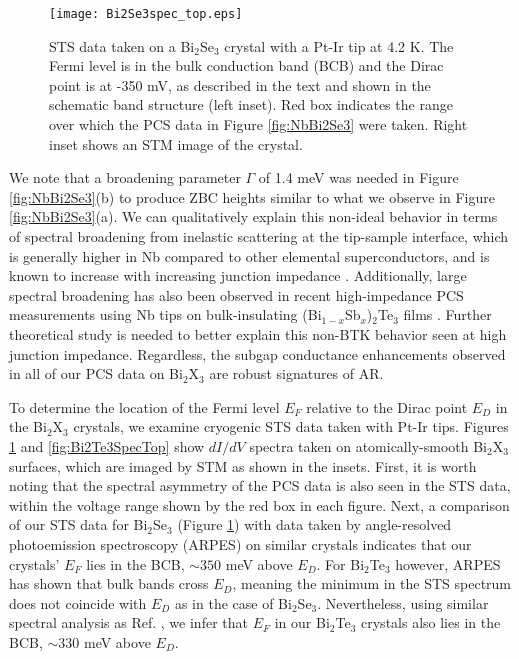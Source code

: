 \documentclass[aps,prl,twocolumn,showpacs,amsmath,amssymb,superscriptaddress,citeautoscript]{revtex4-1}
\begin{document}
\begin{figure}
\texttt{[image: Bi2Se3spec\_top.eps]}
\caption{\label{fig:Bi2Se3SpecTop} STS data taken on a Bi$_{2}$Se$_{3}$ crystal with a Pt-Ir tip at 4.2 K. The Fermi level is in the bulk conduction band (BCB) and the Dirac point is at -350 mV, as described in the text and shown in the schematic band structure (left inset).  Red box indicates the range over which the PCS data in Figure \ref{fig:NbBi2Se3} were taken.  Right inset shows an STM image of the crystal.}
\end{figure}


We note that a broadening parameter $\Gamma$ of 1.4 meV was needed in Figure \ref{fig:NbBi2Se3}(b) to produce ZBC heights similar to what we observe in Figure \ref{fig:NbBi2Se3}(a).  We can qualitatively explain this non-ideal behavior in terms of spectral broadening from inelastic scattering at the tip-sample interface, which is generally higher in Nb compared to other elemental superconductors, and is known to increase with increasing junction impedance \cite{Naidyuk1996,Slobodzian2002}. Additionally, large spectral broadening has also been observed in recent high-impedance PCS measurements using Nb tips on bulk-insulating (Bi$_{1-x}$Sb$_x$)$_2$Te$_3$ films \cite{Borisov2016}. Further theoretical study is needed to better explain this non-BTK behavior seen at high junction impedance.  Regardless, the subgap conductance enhancements observed in all of our PCS data on Bi$_{2}$X$_{3}$ are robust signatures of AR.


To determine the location of the Fermi level $E_{F}$ relative to the Dirac point $E_{D}$ in the Bi$_{2}$X$_{3}$ crystals, we examine cryogenic STS data taken with Pt-Ir tips.  Figures \ref{fig:Bi2Se3SpecTop} and \ref{fig:Bi2Te3SpecTop} show $dI/dV$ spectra taken on atomically-smooth Bi$_{2}$X$_{3}$ surfaces, which are imaged by STM as shown in the insets.  First, it is worth noting that the spectral asymmetry of the PCS data is also seen in the STS data, within the voltage range shown by the red box in each figure.  Next, a comparison of our STS data for Bi$_{2}$Se$_{3}$ (Figure \ref{fig:Bi2Se3SpecTop}) with data taken by angle-resolved photoemission spectroscopy (ARPES) on similar crystals \cite{Xia2009} indicates that our crystals' $E_{F}$ lies in the BCB, $\sim 350$ meV above $E_{D}$.  For Bi$_{2}$Te$_{3}$ however, ARPES has shown \cite{Alpichshev2010} that bulk bands cross $E_{D}$, meaning the minimum in the STS spectrum does not coincide with $E_{D}$ as in the case of Bi$_{2}$Se$_{3}$.  Nevertheless, using similar spectral analysis as Ref.  \cite{Alpichshev2010}, we infer that $E_{F}$ in our Bi$_{2}$Te$_{3}$ crystals also lies in the BCB, $\sim330$ meV above $E_{D}$.
\end{document}

